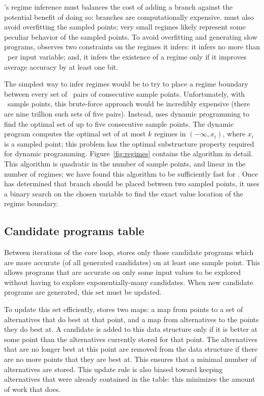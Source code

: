 \documentclass[paper.tex]{subfiles}
\begin{document}
\casio's regime inference must balances
  the cost of adding a branch against the potential benefit of doing so:
  branches are computationally expensive.
\casio must also avoid overfitting the sampled points;
  very small regimes likely represent
  some peculiar behavior of the sampled points.
To avoid overfitting and generating slow programs,
  \casio observes two constraints on the regimes it infers:
  it infers no more than \nRegimes\ per input variable;
  and, it infers the existence of a regime
  only if it improves average accuracy by at least one bit.

The simplest way to infer regimes would be to try
  to place a regime boundary between every set
  of \nRegimes\ pairs of consecutive sample points.
Unfortunately, with \nSample\ sample points,
  this brute-force approach would be incredibly expensive
  (there are nine trillion such sets of five pairs).
Instead, \casio uses dynamic programming
  to find the optimal set of up to five consecutive sample points.
The dynamic program computes the optimal set
  of at most $k$ regimes in $(-\infty, x_i)$, where $x_i$ is a sampled point;
  this problem has the optimal substructure property
  required for dynamic programming.
Figure~\ref{fig:regimes} contains the algorithm in detail.
This algorithm is quadratic in the number of sample points,
  and linear in the number of regimes;
  we have found this algorithm to be sufficiently fast for \casio.
Once \casio has determined that branch should be placed
  between two sampled points,
  it uses a binary search on the chosen variable to 
  find the exact value location of the regime boundary.


\subsection{Candidate programs table}

Between iterations of the core loop,
  \casio stores only those candidate programs
  which are more accurate (of all generated candidates)
  on at least one sample point.
This allows programs that are accurate
  on only some input values to be explored
  without having to explore exponentially-many candidates.
When new candidate programs are generated,
  this set must be updated.

To update this set efficiently, \casio stores two maps:
  a map from points to a set of alternatives that do best at that point,
  and a map from alternatives to the points they do best at.
A candidate is added to this data structure
  only if it is better at some point
  than the alternatives currently stored for that point.
The alternatives that are no longer best at this point
  are removed from the data structure
  if there are no more points that they are best at.
This ensures that a minimal number of alternatives are stored.
This update rule is also biased toward keeping alternatives
  that were already contained in the table:
  this minimizes the amount of work that \casio does.
\end{document}
